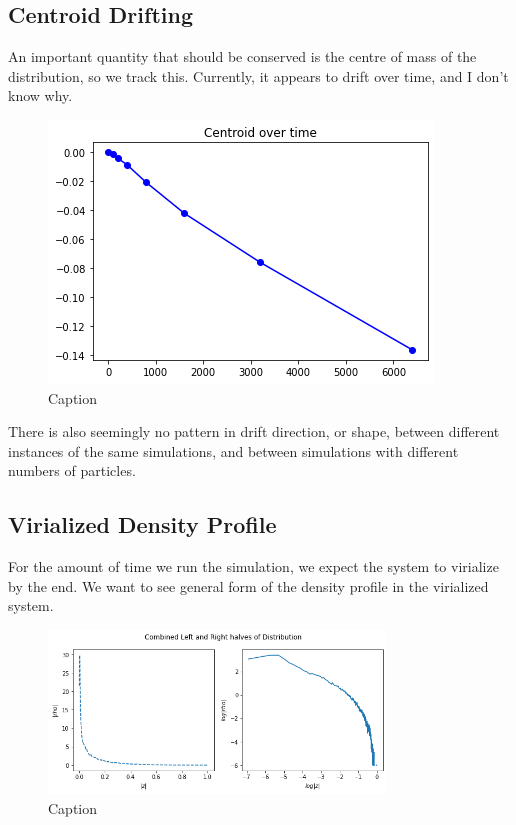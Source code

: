 \documentclass[oneside]{book}
\begin{document}
\subsection{Centroid Drifting}
An important quantity that should be conserved is the centre of mass of the distribution, so we track this. {\color{red}Currently, it appears to drift over time, and I don't know why}.
\begin{figure}[h]
    \centering
    \includegraphics[scale = 0.75]{Images/Centroid.png}
    \caption{Caption}
    \label{Centroid Drift}
\end{figure}
There is also seemingly no pattern in drift direction, or shape, between different instances of the same simulations, and between simulations with different numbers of particles.

\subsection{Virialized Density Profile}
For the amount of time we run the simulation, we expect the system to virialize by the end. We want to see general form of the density profile in the virialized system.
\begin{figure}[h]
    \centering
    \includegraphics[width = 0.8\textwidth]{Images/DensityProfile.png}
    \caption{Caption}
    \label{fig:my_label}
\end{figure}
\end{document}
